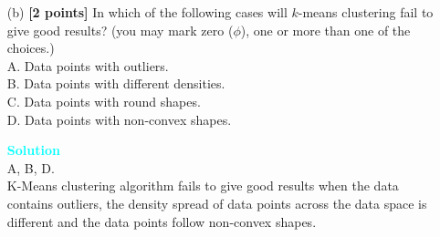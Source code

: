 \documentclass[10pt]{article}
\newenvironment{solution}
    { \begin{mdframed}[backgroundcolor=gray!10] \textcolor{cyan}{\textbf{Solution}} \\}
    {  \end{mdframed}}
\begin{document}
\begin{enumerate}
\begin{itemize}
		      \item[(b)] \textbf{[2 points]}
		            In which of the following cases will $k$-means clustering fail to give good results?
		            (you may mark zero ($\phi$), one or more than one of the choices.)\\
		            A. Data points with outliers.\\
		            B. Data points with different densities.\\
		            C. Data points with round shapes.\\
		            D. Data points with non-convex shapes.
		            \begin{solution}
			            A, B, D.\\
			            K-Means clustering algorithm fails to give good results when the data contains outliers, the density spread of data points across the data space is different and the data points follow non-convex shapes.
		            \end{solution}

	      \end{itemize}




\end{enumerate}
\end{document}
